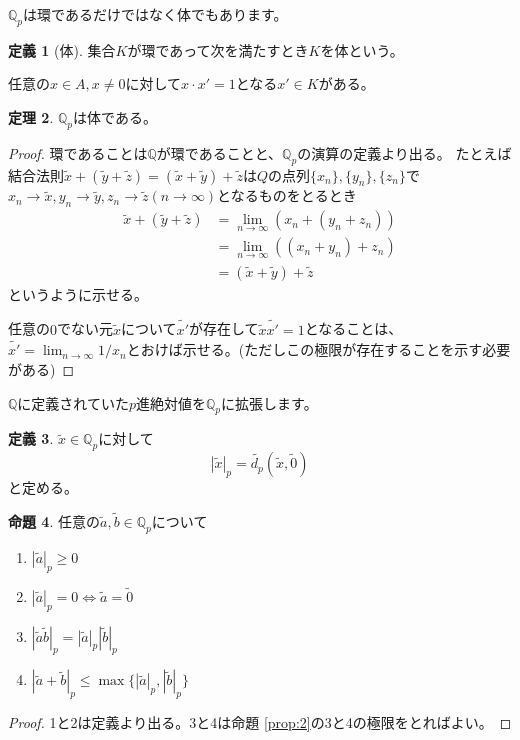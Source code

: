 \documentclass[uplatex]{jsarticle}
\newcommand{\Q}{\mathbb{Q}}
\theoremstyle{definition} %
\newtheorem{thm}{定理}
\newtheorem{defi}[thm]{定義}
\newtheorem{prop}[thm]{命題}
\begin{document}
$\Q_p$は環であるだけではなく体でもあります。

\begin{oframed}\begin{defi}[体]
集合$K$が環であって次を満たすとき$K$を体という。

任意の$x \in A, x \ne 0$に対して$x \cdot x' = 1$となる$x' \in K$がある。
\end{defi}\end{oframed}

\begin{oframed}\begin{thm}
$\Q_p$は体である。
\end{thm}\end{oframed}
\begin{proof}
環であることは$\Q$が環であることと、$\Q_p$の演算の定義より出る。
たとえば結合法則$\tilde{x} + (\tilde{y} + \tilde{z}) = (\tilde{x} + \tilde{y}) + \tilde{z}$は$Q$の点列$\{x_n\}, \{y_n\}, \{z_n\}$で$x_n \to \tilde{x}, y_n \to \tilde{y}, z_n \to \tilde{z} (n \to \infty)$となるものをとるとき
\begin{align*}
\tilde{x} + (\tilde{y} + \tilde{z}) &= \lim_{n\to\infty} (x_n + (y_n + z_n)) \\
 &= \lim_{n\to\infty} ((x_n + y_n) + z_n) \\
 &= (\tilde{x} + \tilde{y}) + \tilde{z}
\end{align*}
というように示せる。

任意の$0$でない元$\tilde{x}$について$\tilde{x'}$が存在して$\tilde{x} \tilde{x'} = 1$となることは、$\tilde{x'} = \lim_{n\to\infty}{1/x_n}$とおけば示せる。(ただしこの極限が存在することを示す必要がある)
\end{proof}

$\Q$に定義されていた$p$進絶対値を$\Q_p$に拡張します。

\begin{oframed}\begin{defi}
$\tilde{x} \in \Q_p$に対して
\[|\tilde{x}|_p = \tilde{d_p}(\tilde{x}, \tilde{0})\]
と定める。
\end{defi}\end{oframed}

\begin{oframed}\begin{prop}\label{prop:4}
任意の$\tilde{a}, \tilde{b} \in \Q_p$について
\begin{enumerate}
\item $|\tilde{a}|_p \geq 0$
\item $|\tilde{a}|_p = 0 \iff \tilde{a} = \tilde{0}$
\item $|\tilde{a}\tilde{b}|_p = |\tilde{a}|_p  |\tilde{b}|_p$
\item $|\tilde{a}+\tilde{b}|_p \leq \max\{|\tilde{a}|_p, |\tilde{b}|_p\}$
\end{enumerate}
\end{prop}\end{oframed}
\begin{proof}
1と2は定義より出る。3と4は命題 \ref{prop:2}の3と4の極限をとればよい。
\end{proof}
\end{document}
